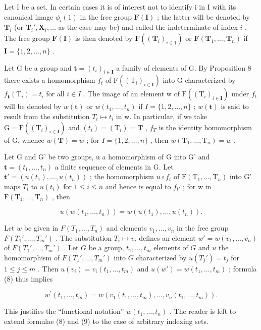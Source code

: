 Let I be a set. In certain cases it is of interest not to identify i in I with its canonical image \(\phi_i(1)\) in the free group \(\mathbf{F}(\mathbf{I})\) ; the latter will be denoted by \(\mathbf{T}_i\) (or \(\mathbf{T}_i', \mathbf{X}_i, \ldots\) as the case may be) and called the indeterminate of index \(i\) . The free group \(\mathbf{F}(\mathbf{I})\) is then denoted by \(\mathbf{F}((\mathbf{T}_i)_{i \in 1})\) or \(\mathbf{F}(\mathbf{T}_1, \ldots, \mathbf{T}_n)\) if \(\mathbf{I} = \{1, 2, \ldots, n\}\) .

Let G be a group and \(\mathbf{t} = (t_{i})_{i \in \mathbf{I}}\) a family of elements of G. By Proposition 8 there exists a homomorphism \(f_{t}\) of \(\mathrm{F}((\mathrm{T}_{i})_{i \in \mathbf{I}})\) into G characterized by \(f_{\mathbf{t}}(\mathrm{T}_{i}) = t_{i}\) for all \(i \in I\) . The image of an element w of \(\mathrm{F}((\mathrm{T}_{i})_{i \in \mathbf{I}})\) under \(f_{t}\) will be denoted by \(w(\mathbf{t})\) or \(w(t_{1}, \ldots, t_{n})\) if \(I = \{1, 2, \ldots, n\}\) ; \(w(\mathbf{t})\) is said to result from the substitution \(T_{i} \mapsto t_{i}\) in w. In particular, if we take \(\mathrm{G} = \mathrm{F}((\mathrm{T}_{i})_{i \in \mathbf{I}})\) and \((t_{i}) = (\mathrm{T}_{i}) = \mathbf{T}\) , \(f_{T}\) is the identity homomorphism of G, whence \(w(\mathbf{T}) = w\) ; for \(I = \{1, 2, \ldots, n\}\) , then \(w(\mathrm{T}_{1}, \ldots, \mathrm{T}_{n}) = w\) .

Let G and G' be two groups, u a homomorphism of G into G' and \(\mathbf{t} = (t_{1}, \ldots, t_{n})\) a finite sequence of elements in G. Let \(\mathbf{t}' = (u(t_{1}), \ldots, u(t_{n}))\) ; the homomorphism \(u \circ f_{t}\) of \(\mathrm{F}(\mathrm{T}_{1}, \ldots, \mathrm{T}_{n})\) into G' maps \(T_{i}\) to \(u(t_{i})\) for \(1 \leqslant i \leqslant n\) and hence is equal to \(f_{t'}\) ; for w in \(\mathrm{F}(\mathrm{T}_{1}, \ldots, \mathrm{T}_{n})\) , then

\[
u (w (t _ {1}, \dots , t _ {n})) = w (u (t _ {1}), \dots , u (t _ {n})).\tag{8}
\]

Let \(w\) be given in \(F(T_1, \ldots, T_n)\) and elements \(v_1, \ldots, v_n\) in the free group \(F(T_1', \ldots, T_m')\) . The substitution \(T_i \mapsto v_i\) defines an element \(w' = w(v_1, \ldots, v_n)\) of \(F(T_1', \ldots, T_m')\) . Let \(G\) be a group, \(t_1, \ldots, t_m\) elements of \(G\) and \(u\) the homomorphism of \(F(T_1', \ldots, T_m')\) into \(G\) characterized by \(u(T_j') = t_j\) for \(1 \leqslant j \leqslant m\) . Then \(u(v_i) = v_i(t_1, \ldots, t_m)\) and \(u(w') = w(t_1, \ldots, t_m)\) ; formula (8) thus implies

\[
w ^ {\prime} (t _ {1}, \dots , t _ {m}) = w (v _ {1} (t _ {1}, \dots , t _ {m}), \dots , v _ {n} (t _ {1}, \dots , t _ {m})).\tag{9}
\]

This justifies the ``functional notation'' \(w(t_{1},\ldots,t_{n})\) . The reader is left to extend formulae (8) and (9) to the case of arbitrary indexing sets.


